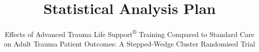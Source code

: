 \documentclass[
]{scrartcl}
\title{Statistical Analysis Plan}
\subtitle{Effects of Advanced Trauma Life Support\textsuperscript{®}
Training Compared to Standard Care on Adult Trauma Patient Outcomes: A
Stepped-Wedge Cluster Randomised Trial}
\author{}
\date{}
\begin{document}


\begin{titlepage}


\newcommand{\titlepagepagealign}{
\ifthenelse{\equal{center}{right}}{\raggedleft}{}
\ifthenelse{\equal{center}{center}}{\centering}{}
\ifthenelse{\equal{center}{left}}{\raggedright}{}
}


\newcommand{\titleandsubtitle}{
{\fontsize{36}{44}\selectfont
\textcolor{white}{\mdseries{\nohyphens{Statistical Analysis Plan}}}\par
}%

\vspace{\betweentitlesubtitle}
{
\fontsize{28}{30}\selectfont
\textcolor{white}{\sffamily{\nohyphens{Effects of Advanced Trauma Life
Support\textsuperscript{®} Training Compared to Standard Care on Adult
Trauma Patient Outcomes: A Stepped-Wedge Cluster Randomised Trial}}}\par
}}
\newcommand{\titlepagetitleblock}{
\titleandsubtitle
}

\newcommand{\authorstyle}[1]{{\textbf{#1}}}

\newcommand{\affiliationstyle}[1]{{\large{#1}}}

\newcommand{\titlepageauthorblock}{
{\authorstyle{\\}}
}

\newcommand{\titlepageaffiliationblock}{
\hangindent=1em
\hangafter=1
{\affiliationstyle{


\vspace{1\baselineskip} 
}}
}
\newcommand{\headerstyled}{%
{}
}
\newcommand{\footerstyled}{%
{\LARGE{Version 0.7.0, 2026-10-07}}
}
\newcommand{\datestyled}{%
{}
}


\newcommand{\titlepageheaderblock}{\headerstyled}

\newcommand{\titlepagefooterblock}{
\footerstyled
}

\newcommand{\titlepagedateblock}{
\datestyled
}

\newcommand{\titleblock}{\newlength{\betweentitlesubtitle}
\setlength{\betweentitlesubtitle}{0.5cm}
{
\titlepagetitlefont
{\titlepagetitleblock}
}

\vspace{1.5cm}
}

\newcommand{\authorblock}{}

\newcommand{\affiliationblock}{}


\end{titlepage}
\end{document}
